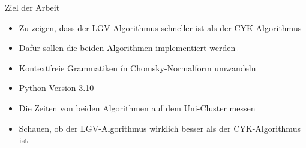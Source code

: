 \documentclass{beamer}
\begin{document}
	\begin{frame}{Ziel der Arbeit}
		\begin{itemize}
			\item Zu zeigen, dass der LGV-Algorithmus schneller ist als der CYK-Algorithmus\vspace*{0.3cm}
			\pause
			\item Dafür sollen die beiden Algorithmen implementiert werden\vspace*{0.3cm}
			\pause
			\item Kontextfreie Grammatiken ín Chomsky-Normalform umwandeln\vspace*{0.3cm}
			\pause
			\item Python Version 3.10\vspace*{0.3cm}
			\pause
			\item Die Zeiten von beiden Algorithmen auf dem Uni-Cluster messen\vspace*{0.3cm}
			\pause
			\item Schauen, ob der LGV-Algorithmus wirklich besser als der CYK-Algorithmus ist\vspace*{0.3cm}
		\end{itemize}
	\end{frame}
	
\end{document}
